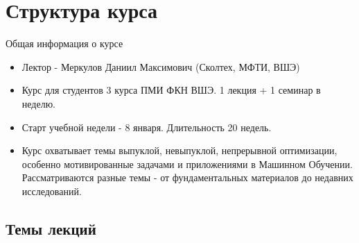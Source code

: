 \documentclass[9pt, aspectratio=169]{beamer}
\begin{document}
\section{Структура курса}
\begin{frame}{Общая информация о курсе}
\begin{minipage}{0.618\textwidth}
    \begin{itemize}
        \item Лектор - Меркулов Даниил Максимович (Сколтех, МФТИ, ВШЭ)
        \item Курс для студентов 3 курса ПМИ ФКН ВШЭ. 1 лекция + 1 семинар в неделю.
        \item Старт учебной недели - 8 января. Длительность 20 недель.
        \item Курс охватывает темы выпуклой, невыпуклой, непрерывной  оптимизации, особенно мотивированные задачами и приложениями в Машинном Обучении. Рассматриваются разные темы - от фундаментальных материалов до недавних исследований.
    \end{itemize}
  \end{minipage}%
  \begin{minipage}{0.382\textwidth}
  \end{minipage}
\end{frame}

\subsection{Темы лекций}
\end{document}
